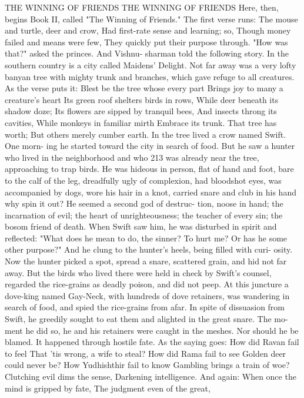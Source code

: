 \documentclass{book}
\begin{document}
THE WINNING OF FRIENDS
THE WINNING OF FRIENDS
Here, then, begins Book II, called "The Winning
of Friends." The first verse runs:
The mouse and turtle, deer and crow,
Had first-rate sense and learning; so,
Though money failed and means were few,
They quickly put their purpose through.
"How was that?" asked the princes. And Vishnu-
sharman told the following story.
In the southern country is a city called Maidens'
Delight. Not far away was a very lofty banyan tree
with mighty trunk and branches, which gave refuge
to all creatures. As the verse puts it:
Blest be the tree whose every part
Brings joy to many a creature's heart
Its green roof shelters birds in rows,
While deer beneath its shadow doze;
Its flowers are sipped by tranquil bees,
And insects throng its cavities,
While monkeys in familiar mirth
Embrace its trunk. That tree has worth;
But others merely cumber earth.
In the tree lived a crow named Swift. One morn-
ing he started toward the city in search of food. But he
saw a hunter who lived in the neighborhood and who
213
was already near the tree, approaching to trap birds.
He was hideous in person, flat of hand and foot, bare
to the calf of the leg, dreadfully ugly of complexion,
had bloodshot eyes, was accompanied by dogs, wore
his hair in a knot, carried snare and club in his hand
why spin it out? He seemed a second god of destruc-
tion, noose in hand; the incarnation of evil; the heart
of unrighteousness; the teacher of every sin; the
bosom friend of death.
When Swift saw him, he was disturbed in spirit
and reflected: "What does he mean to do, the sinner?
To hurt me? Or has he some other purpose?" And
he clung to the hunter's heels, being filled with curi-
osity.
Now the hunter picked a spot, spread a snare,
scattered grain, and hid not far away. But the birds
who lived there were held in check by Swift's counsel,
regarded the rice-grains as deadly poison, and did not
peep.
At this juncture a dove-king named Gay-Neck,
with hundreds of dove retainers, was wandering in
search of food, and spied the rice-grains from afar.
In spite of dissuasion from Swift, he greedily sought
to eat them and alighted in the great snare. The mo-
ment he did so, he and his retainers were caught in the
meshes. Nor should he be blamed. It happened
through hostile fate. As the saying goes:
How did Ravan fail to feel
That 'tis wrong, a wife to steal?
How did Rama fail to see
Golden deer could never be?
How Yudhishthir fail to know
Gambling brings a train of woe?
Clutching evil dims the sense,
Darkening intelligence.
And again:
When once the mind is gripped by fate,
The judgment even of the great,
\end{document}
